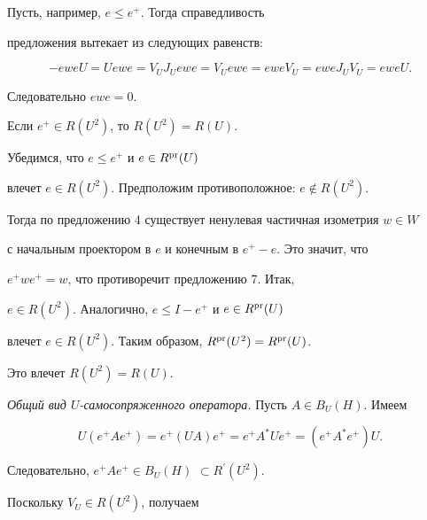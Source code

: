 \begin{pf}


Пусть, например, $e\leq e^{+}$. Тогда справедливость


предложения вытекает из следующих равенств:


$$


-eweU=Uewe=V_{U}J_{U}ewe=V_{U}ewe=eweV_{U}=eweJ_{U}V_{U}=eweU.


$$


Следовательно $ewe=0$.


\end{pf}





\begin{prop}


Если $e^{+}\in R(U^{2})$, то $R(U^{2})=R(U)$.


\end{prop}





\begin{pf}


Убедимся, что $e\leq e^{+}$ и $e\in R^{\operatorname{pr}}(U)$


влечет $e\in R(U^{2})$. Предположим противоположное: $e\notin R(U^{2})$.


Тогда по предложению 4 существует ненулевая частичная изометрия $w\in W$


с начальным проектором в $e$ и конечным в $e^{+}-e$. Это значит, что


$e^{+}we^{+}=w$, что противоречит предложению 7. Итак,


$e\in R(U^{2})$. Аналогично, $e\leq I-e^{+}$ и $e\in R^{\operatorname{pr}}(U)$


влечет $e\in R(U^{2})$. Таким образом, $R^{\operatorname{pr}}(U^{2})=R^{\operatorname{pr}}(U)$.


Это влечет $R(U^{2})=R(U)$.


\end{pf}





{\it Общий вид $U$-самосопряженного оператора.} Пусть $A\in B_{U}(H)$. Имеем


$$


U(e^{+}Ae^{+})=e^{+}(UA)e^{+}=e^{+}A^{*}Ue^{+}=(e^{+}A^{*}e^{+})U.


$$


Следовательно, $e^{+}Ae^{+}\in B_{U}(H)$ $\subset R^{\prime}(U^{2})$.


Поскольку $V_{U}\in R(U^{2})$, получаем


